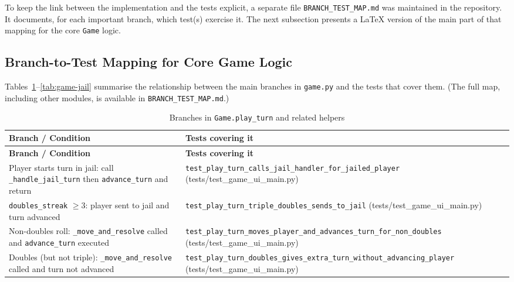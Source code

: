 \documentclass[11pt]{article}
\begin{document}
To keep the link between the implementation and the tests explicit, a separate file \texttt{BRANCH\_TEST\_MAP.md} was maintained in the repository.  It documents, for each important branch, which test(s) exercise it.  The next subsection presents a LaTeX version of the main part of that mapping for the core \texttt{Game} logic.

\subsection*{Branch-to-Test Mapping for Core Game Logic}

Tables~\ref{tab:game-playturn}--\ref{tab:game-jail} summarise the relationship between the main branches in \texttt{game.py} and the tests that cover them.  (The full map, including other modules, is available in \texttt{BRANCH\_TEST\_MAP.md}.)

\begin{longtable}{>{\raggedright\arraybackslash}p{} >{\raggedright\arraybackslash}p{}}
\caption{Branches in \texttt{Game.play\_turn} and related helpers}\label{tab:game-playturn}\\\hline
\textbf{Branch / Condition} & \textbf{Tests covering it} \\ \hline
\endfirsthead
\hline
\textbf{Branch / Condition} & \textbf{Tests covering it} \\ \hline
\endhead
Player starts turn in jail: call \texttt{\_handle\_jail\_turn} then \texttt{advance\_turn} and return & \texttt{test\_play\_turn\_calls\_jail\_handler\_for\_jailed\_player} (tests/test\_game\_ui\_main.py) \\ \hline
\texttt{doubles\_streak} $\geq 3$: player sent to jail and turn advanced & \texttt{test\_play\_turn\_triple\_doubles\_sends\_to\_jail} (tests/test\_game\_ui\_main.py) \\ \hline
Non-doubles roll: \texttt{\_move\_and\_resolve} called and \texttt{advance\_turn} executed & \texttt{test\_play\_turn\_moves\_player\_and\_advances\_turn\_for\_non\_doubles} (tests/test\_game\_ui\_main.py) \\ \hline
Doubles (but not triple): \texttt{\_move\_and\_resolve} called and turn not advanced & \texttt{test\_play\_turn\_doubles\_gives\_extra\_turn\_without\_advancing\_player} (tests/test\_game\_ui\_main.py) \\ \hline
\end{longtable}
\end{document}
